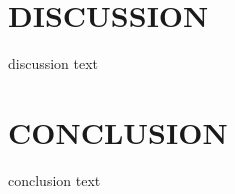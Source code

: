 \documentclass[letterpaper,twoside,12pt,french]{report}
\begin{document}
\chapter*{\uppercase{Discussion}}
discussion text
\chapter*{\uppercase{Conclusion}}
conclusion text
\newpage
\begin{spacing}{1}
    \nocite{*}
    

    
\end{spacing}
\end{document}
